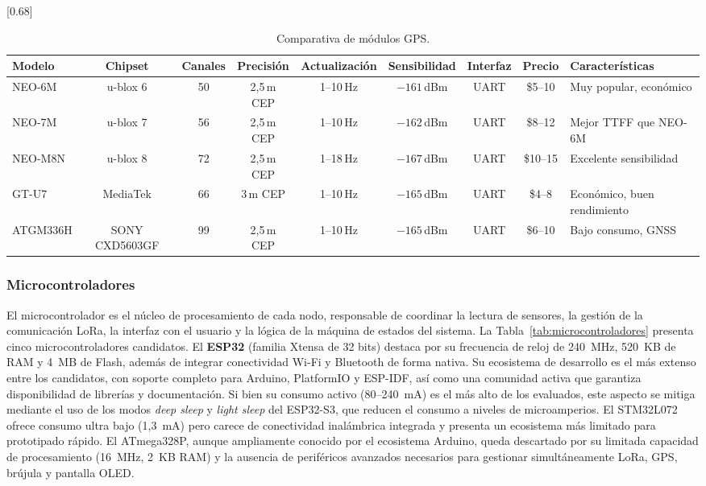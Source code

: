 \begin{table}[H]
\begin{center}
\caption{Comparativa de módulos GPS.}
\scalebox{0.68}[0.68]{
\begin{tabular}{| l | c | c | c | c | c | c | c | l |}
\hline
 \textbf{Modelo} & \textbf{Chipset} & \textbf{Canales} & \textbf{Precisión} & \textbf{Actualización} & \textbf{Sensibilidad} & \textbf{Interfaz} & \textbf{Precio} & \textbf{Características} \\
\hline
\hline
 NEO-6M & u-blox 6 & 50 & 2,5\,m CEP & 1--10\,Hz & $-161$\,dBm & UART & \$5--10 & Muy popular, económico \\
 NEO-7M & u-blox 7 & 56 & 2,5\,m CEP & 1--10\,Hz & $-162$\,dBm & UART & \$8--12 & Mejor TTFF que NEO-6M \\
 NEO-M8N & u-blox 8 & 72 & 2,5\,m CEP & 1--18\,Hz & $-167$\,dBm & UART & \$10--15 & Excelente sensibilidad \\
 GT-U7 & MediaTek & 66 & 3\,m CEP & 1--10\,Hz & $-165$\,dBm & UART & \$4--8 & Económico, buen rendimiento \\
 ATGM336H & SONY CXD5603GF & 99 & 2,5\,m CEP & 1--10\,Hz & $-165$\,dBm & UART & \$6--10 & Bajo consumo, GNSS \\
\hline
\end{tabular}}
\label{tab:modulos_gps}
\end{center}
\end{table}

\subsubsection{Microcontroladores}

El microcontrolador es el núcleo de procesamiento de cada nodo, responsable de coordinar la lectura de sensores, la gestión de la comunicación LoRa, la interfaz con el usuario y la lógica de la máquina de estados del sistema. La Tabla~\ref{tab:microcontroladores} presenta cinco microcontroladores candidatos. El \textbf{ESP32} (familia Xtensa de 32 bits) destaca por su frecuencia de reloj de 240~MHz, 520~KB de RAM y 4~MB de Flash, además de integrar conectividad Wi-Fi y Bluetooth de forma nativa. Su ecosistema de desarrollo es el más extenso entre los candidatos, con soporte completo para Arduino, PlatformIO y ESP-IDF, así como una comunidad activa que garantiza disponibilidad de librerías y documentación. Si bien su consumo activo (80--240~mA) es el más alto de los evaluados, este aspecto se mitiga mediante el uso de los modos \textit{deep sleep} y \textit{light sleep} del ESP32-S3, que reducen el consumo a niveles de microamperios. El STM32L072 ofrece consumo ultra bajo (1,3~mA) pero carece de conectividad inalámbrica integrada y presenta un ecosistema más limitado para prototipado rápido. El ATmega328P, aunque ampliamente conocido por el ecosistema Arduino, queda descartado por su limitada capacidad de procesamiento (16~MHz, 2~KB RAM) y la ausencia de periféricos avanzados necesarios para gestionar simultáneamente LoRa, GPS, brújula y pantalla OLED.

